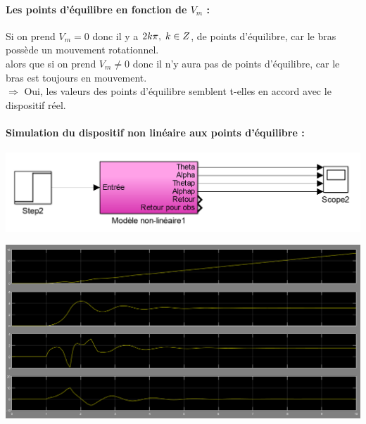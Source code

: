 \documentclass[12pt, a4paper, openany]{report}
\begin{document}
 \paragraph{Les points d'équilibre en fonction de $V_{m}$ :\\}
 
 Si on prend  $V_{m}=0$ donc il y a  $2k\pi,\hspace{1mm} k\in Z$, de points d'équilibre, car le bras possède un mouvement rotationnel.  \\
 alors que si on prend $V_{m}\neq 0$ donc il n'y aura pas de points d'équilibre, car le bras est toujours en mouvement. \\
 $\Rightarrow$ Oui, les valeurs des points d'équilibre semblent t-elles en accord avec le dispositif réel.\\
 
   \paragraph{Simulation du dispositif non linéaire aux points d'équilibre :\\}
 
  
\begin{center}
\includegraphics[scale=0.5]{modelenonlineairesimulink.png}
\label{fig1} 
\end{center} 
 
\begin{center}
\includegraphics[scale=0.4]{modelenonlin1.PNG}
\label{fig1} 
\end{center} 
 
\end{document}
